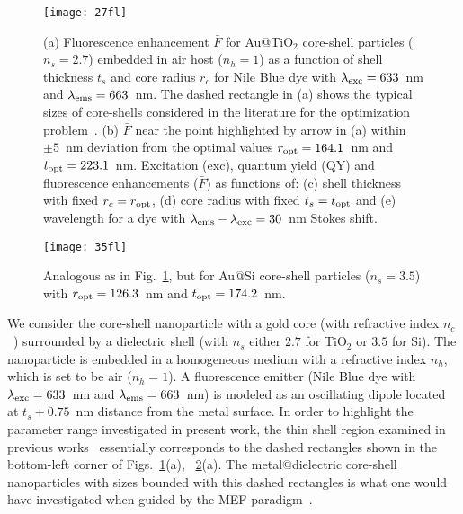\documentclass[9pt,twocolumn,twoside]{osajnl}
\newcommand{\ld}{\lambda}
\begin{document}
\begin{figure}[t]
 \centering
 \texttt{[image: 27fl]}
 \caption{(a) Fluorescence enhancement $\bar F$ for Au@TiO$_2$ core-shell particles ($n_s=2.7$) embedded in air host ($n_h = 1$) as a function of shell thickness $t_s$ and core radius $r_c$ for Nile Blue dye with $\ld_{\rm exc} = 633$~nm and $\ld_{\rm ems}=663$~nm.
 The dashed rectangle in (a) shows the typical sizes of core-shells considered in the literature for the optimization problem~\cite{Sun20JPCC,Wan2021}.
 (b) $\bar F$ near the point highlighted by arrow in (a) within $\pm 5$~nm deviation from the optimal values $r_{\rm opt}=164.1$~nm and $t_{\rm opt}=223.1$~nm.
 Excitation (exc), quantum yield (QY) and fluorescence enhancements ($\bar F$) as functions of: 
 (c) shell thickness with fixed $r_c=r_{\rm opt}$, 
 (d) core radius with fixed $t_s=t_{\rm opt}$ and 
 (e) wavelength for a dye with $\ld_{\rm ems}-\ld_{\rm exc}=30$~nm Stokes shift.}
 \label{fig:AuTiO2}
\end{figure}
\begin{figure}[t]
 \centering
 \texttt{[image: 35fl]}
 \caption{Analogous as in Fig.~\ref{fig:AuTiO2}, but for Au@Si core-shell particles ($n_s=3.5$) with $r_{\rm opt}=126.3$~nm and $t_{\rm opt}=174.2$~nm.}
 \label{fig:AuSi}
\end{figure}
We consider the core-shell nanoparticle with a gold core (with refractive index $n_c$~\cite{Johnson1972}) surrounded by a dielectric shell (with $n_s$ either $2.7$ for TiO$_2$ or $3.5$ for Si).
The nanoparticle is embedded in a homogeneous medium with a refractive index $n_h$, which is set to be air ($n_h=1$).
A fluorescence emitter (Nile Blue dye with $\ld_{\rm exc} = 633$~nm and $\ld_{\rm ems}=663$~nm) is modeled as an oscillating dipole located at $t_s+0.75$~nm distance from the metal surface.
In order to highlight the parameter range investigated in present work, the thin shell region examined in previous works~\cite{Tovmachenko2006,Arruda2017a,Sun20JPCC,Wan2021} essentially corresponds to the dashed rectangles 
shown in the bottom-left corner of Figs.~\ref{fig:AuTiO2}(a), ~\ref{fig:AuSi}(a). 
The metal@dielectric core-shell nanoparticles with sizes bounded with this dashed rectangles is what one would have investigated when guided by the MEF paradigm~\cite{Lakowicz2008}.
\end{document}
